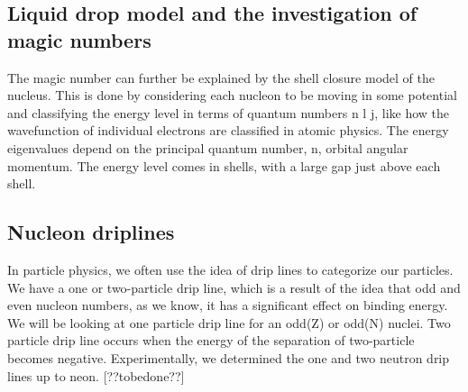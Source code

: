 \subsection{Liquid drop model and the investigation of magic numbers}
The magic number can further be explained by the shell closure model of the nucleus.
This is done by considering each nucleon to be moving in some potential and classifying the energy level in terms of quantum numbers n l j, like how the wavefunction of individual electrons are classified in atomic physics.
The energy eigenvalues depend on the principal quantum number, n, orbital angular momentum.
The energy level comes in shells, with a large gap just above each shell. \cite{smolanczuk_particle}

\subsection{Nucleon driplines}
In particle physics, we often use the idea of drip lines to categorize our particles.
We have a one or two-particle drip line, which is a result of the idea that odd and even nucleon numbers, as we know, it has a significant effect on binding energy.
We will be looking at one particle drip line for an odd(Z) or odd(N) nuclei.
Two particle drip line occurs when the energy of the separation of two-particle becomes negative.
Experimentally, we determined the one and two neutron drip lines up to neon. [??tobedone??]